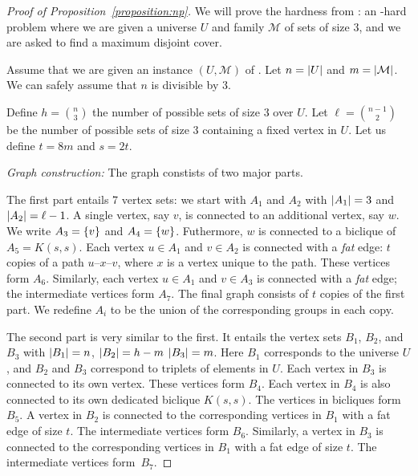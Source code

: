 \begin{proof}[Proof of Proposition~\ref{proposition:np}]
We will prove the hardness from \tmatch: an \np-hard problem where we are given
a universe $U$ and family $\mathcal{M}$ of sets of size $3$, and we are asked
to find a maximum disjoint cover. 

Assume that we are given an instance $(U, \mathcal{M})$ of \tmatch.  Let $n =
{\left|U\right|}$ and $m = {\left|\mathcal{M}\right|}$. We can safely assume that $n$ is divisible by 3.

Define $h = {n \choose 3}$ the number of possible
sets of size $3$ over $U$. Let $\ell = {n - 1 \choose 2}$ be the number of possible
sets of size $3$ containing a fixed vertex in $U$.
Let us define $t = 8m$ and $s = 2t$.

\emph{Graph construction:}
The graph constists of two major parts.

The first part entails 7 vertex sets: we start with $A_1$ and $A_2$ with ${\left|A_1\right|} = 3$ and ${\left|A_2\right|}
= \ell - 1$.
A single vertex, say $v$, 
is connected to an additional vertex, say $w$. We write $A_3 = \left\{v\right\}$ and $A_4 = \left\{w\right\}$.
Futhermore, $w$ is connected to a biclique of $A_5 = K(s, s)$.
%
Each vertex $u \in A_1$ and $v \in A_2$ is connected with a \emph{fat} edge:
$t$ copies of a path $u$--$x$--$v$, where $x$ is a vertex unique to the path.
These vertices form $A_6$.
Similarly, each vertex $u \in A_1$ and $v \in A_3$ is connected with a \emph{fat} edge;
the intermediate vertices form $A_7$.
%
%
The final graph consists of $t$ copies of the first part. We redefine $A_i$ to be
the union of the corresponding groups in each copy.

The second part is very similar to the first.  It entails the vertex sets
$B_1$, $B_2$, and $B_3$ with ${\left|B_1\right|} = n$, ${\left|B_2\right|} = h - m$ ${\left|B_3\right|} = m$.
Here $B_1$ corresponds to the universe $U$, and $B_2$ and $B_3$ correspond to
triplets of elements in $U$. Each vertex in $B_3$ is connected to its own vertex.
These vertices form $B_4$. Each vertex in $B_4$ is also connected to its own dedicated biclique
$K(s, s)$. The vertices in bicliques form $B_5$.
A vertex in $B_2$ is connected to the corresponding vertices in $B_1$ with a fat edge
of size $t$. The intermediate vertices form $B_6$.
Similarly, a vertex in $B_3$ is connected to the corresponding vertices in $B_1$ with a fat edge
of size $t$. The intermediate vertices form~$B_7$.




\end{proof}

